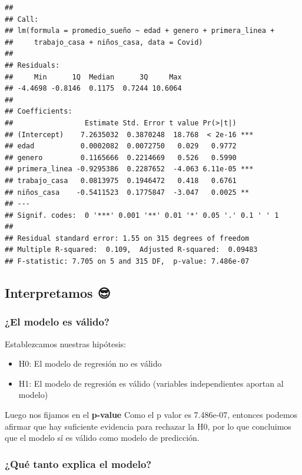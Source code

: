 \documentclass[
]{article}
\providecommand{\tightlist}{%
  \setlength{\itemsep}{0pt}\setlength{\parskip}{0pt}}
\begin{document}
\begin{verbatim}
## 
## Call:
## lm(formula = promedio_sueño ~ edad + genero + primera_linea + 
##     trabajo_casa + niños_casa, data = Covid)
## 
## Residuals:
##     Min      1Q  Median      3Q     Max 
## -4.4698 -0.8146  0.1175  0.7244 10.6064 
## 
## Coefficients:
##                 Estimate Std. Error t value Pr(>|t|)    
## (Intercept)    7.2635032  0.3870248  18.768  < 2e-16 ***
## edad           0.0002082  0.0072750   0.029   0.9772    
## genero         0.1165666  0.2214669   0.526   0.5990    
## primera_linea -0.9295386  0.2287652  -4.063 6.11e-05 ***
## trabajo_casa   0.0813975  0.1946472   0.418   0.6761    
## niños_casa    -0.5411523  0.1775847  -3.047   0.0025 ** 
## ---
## Signif. codes:  0 '***' 0.001 '**' 0.01 '*' 0.05 '.' 0.1 ' ' 1
## 
## Residual standard error: 1.55 on 315 degrees of freedom
## Multiple R-squared:  0.109,  Adjusted R-squared:  0.09483 
## F-statistic: 7.705 on 5 and 315 DF,  p-value: 7.486e-07
\end{verbatim}

\subsection{\texorpdfstring{\textbf{Interpretamos
😎}}{Interpretamos 😎}}\label{interpretamos-2}

\subsubsection{\texorpdfstring{\textbf{¿El modelo es
válido?}}{¿El modelo es válido?}}\label{el-modelo-es-vuxe1lido-2}

Establezcamos nuestras hipótesis:

\begin{itemize}
\tightlist
\item
  H0: El modelo de regresión no es válido
\item
  H1: El modelo de regresión es válido (variables independientes aportan
  al modelo)
\end{itemize}

Luego nos fijamos en el \textbf{p-value} Como el p valor es 7.486e-07,
entonces podemos afirmar que hay suficiente evidencia para rechazar la
H0, por lo que concluimos que el modelo sí es válido como modelo de
predicción.

\subsubsection{\texorpdfstring{\textbf{¿Qué tanto explica el
modelo?}}{¿Qué tanto explica el modelo?}}\label{quuxe9-tanto-explica-el-modelo-2}
\end{document}
